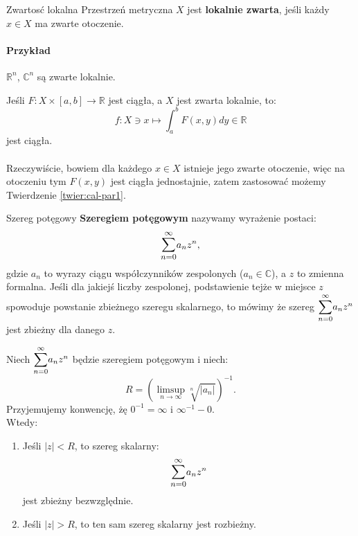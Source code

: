 \documentclass{article}
\numberwithin{defi}{section}
\numberwithin{defi}{section}
\newcommand{\R}{\mathbb{R}}
\newcommand{\C}{\mathbb{C}}
\newcommand{\oo}{\infty}
\providecommand{\inv}{^{-1}}
\newcommand{\tb}[1]{\textbf{#1}}
\newcommand{\bsumoo}[1]{\mathlarger{\sum_{#1 = 0}^{\oo}}}
\begin{document}
\begin{defr}{Zwartosć lokalna}
    Przestrzeń metryczna $X$ jest \tb{lokalnie zwarta}, jeśli każdy $x \in X$ ma zwarte otoczenie.
\end{defr}

\paragraph{Przykład} $\R^n$, $\C^n$ są zwarte lokalnie.


\begin{obs}{}
    Jeśli $F: X \times [a, b] \to \R$ jest ciągła, a $X$ jest zwarta lokalnie, to: \begin{equation}
        f: X \ni x \mapsto \int_{a}^{b} F(x, y) dy \in \R
    \end{equation} jest ciągła.
\end{obs}

\paragraph{} Rzeczywiście, bowiem dla każdego $x \in X$ istnieje jego zwarte otoczenie, więc na otoczeniu tym $F(x, y)$ jest ciągła jednostajnie, zatem zastosować możemy Twierdzenie \ref*{twier:cal-par1}.

\begin{defr}{Szereg potęgowy}
    \tb{Szeregiem potęgowym} nazywamy wyrażenie postaci: \begin{equation*}
       \bsumoo{n} a_n z^n,
    \end{equation*} gdzie $a_n$ to wyrazy ciągu współczynników zespolonych ($a_n \in \C$), a $z$ to zmienna formalna. Jeśli dla jakiejś liczby zespolonej, podstawienie tejże w miejsce $z$ spowoduje powstanie zbieżnego szeregu skalarnego, to mówimy że szereg $\bsumoo{n} a_n z^n$ jest zbieżny dla danego $z$.
\end{defr}

\begin{twier}{}
    Niech $\bsumoo{n} a_n z^n$ będzie szeregiem potęgowym i niech: \begin{equation}
        R = (\limsup_{n \to \oo} \sqrt[n]{|a_n|}) ^{-1}.
    \end{equation} Przyjemujemy konwencję, żę $0 \inv = \oo$ i $\oo \inv - 0$. \\
    Wtedy: \begin{enumerate}
        \item Jeśli $|z| < R$, to szereg skalarny: \begin{equation}
            \bsumoo{n} a_n z^n 
        \end{equation} jest zbieżny bezwzględnie.
        \item Jeśli $|z| > R$, to ten sam szereg skalarny jest rozbieżny.
    \end{enumerate}
\end{twier}
\end{document}
